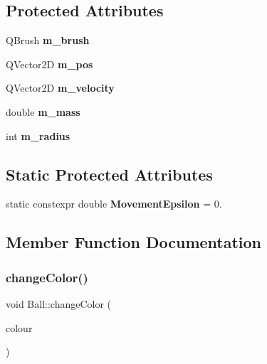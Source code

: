 \subsection*{Protected Attributes}
\begin{DoxyCompactItemize}
\item 
\mbox{\label{class_ball_a8eeb4e79fca6415f0bacb80457f4487c}} 
Q\+Brush {\bfseries m\+\_\+brush}
\item 
\mbox{\label{class_ball_a50924825251df59b5715b123ac5f6395}} 
Q\+Vector2D {\bfseries m\+\_\+pos}
\item 
\mbox{\label{class_ball_a7c207fe7385c8d519ac85e8e6c9ceae5}} 
Q\+Vector2D {\bfseries m\+\_\+velocity}
\item 
\mbox{\label{class_ball_ac1cab784df7b44bc48d236657c28a199}} 
double {\bfseries m\+\_\+mass}
\item 
\mbox{\label{class_ball_a5121dd03edea304520c4e9f286be67c0}} 
int {\bfseries m\+\_\+radius}
\end{DoxyCompactItemize}
\subsection*{Static Protected Attributes}
\begin{DoxyCompactItemize}
\item 
\mbox{\label{class_ball_a6b8169e6104a6fbcd29f81a7375bb031}} 
static constexpr double {\bfseries Movement\+Epsilon} = 0.
\end{DoxyCompactItemize}


\subsection{Member Function Documentation}
\mbox{\label{class_ball_ac68ba5765f29f3322c2f2de3fc61e5ae}} 
\subsubsection{\texorpdfstring{change\+Color()}{changeColor()}}
{\footnotesize\ttfamily void Ball\+::change\+Color (\begin{DoxyParamCaption}\item[{const Q\+Color \&}]{colour }\end{DoxyParamCaption})\hspace{0.3cm}{\ttfamily [inline]}}



